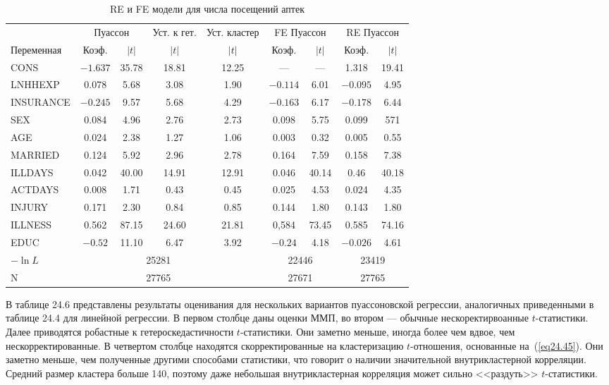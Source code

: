 \begin{table}[h]
\caption{\label{tab:pred} RE и FE модели для числа посещений аптек}
\begin{center}
\begin{tabular}{ p{2.5cm} cc cc cc cc}
\hline
 & \multicolumn{2}{c}{Пуассон} & Уст. к гет. & Уст. кластер & \multicolumn{2}{c}{FE Пуассон} & \multicolumn{2}{c}{RE Пуассон}\\
\cmidrule(r){2-3} \cmidrule(r){4-4} \cmidrule(r){5-5} \cmidrule(r){6-7} \cmidrule(r){8-9}
Переменная & Коэф. & $|t|$ & $|t|$ & $|t|$ & Коэф. & $|t|$ & Коэф. & $|t|$ \\
\hline
CONS & $-1.637$ & 35.78 & 18.81 & 12.25 & ---  & --- & 1.318 & 19.41 \\
LNHHEXP & 0.078 & 5.68 & 3.08 & 1.90 & $-0.114$ & 6.01 & $-0.095$ & 4.95 \\
INSURANCE & $-0.245$ & 9.57 & 5.68 & 4.29 & $-0.163$ & $6.17$ & $-0.178$ & $6.44$ \\
SEX & 0.084 & 4.96 & 2.76 & 2.73 & 0.098 & 5.75 & 0.099 & 571 \\
AGE & 0.024 & 2.38 & 1.27 & 1.06 & 0.003 & 0.32 & 0.005 & 0.55 \\
MARRIED & 0.124 & 5.92 & 2.96 & 2.78 & 0.164 & 7.59 & 0.158 & 7.38 \\
ILLDAYS & 0.042 & 40.00 & 14.91 & 12.91 & 0.046 & 40.14 & 0.46 & 40.18 \\
ACTDAYS & 0.008 & 1.71 & 0.43 & 0.45 & 0.025 & 4.53 & 0.024 & 4.35 \\
INJURY & 0.171 & 2.30 & 0.84 & 0.85 & 0.144 & 1.80 & 0.143 & 1.80 \\
ILLNESS & 0.562 & 87.15 & 24.60 & 21.81 & 0,584 & 73.45 & 0.585 & 74.16 \\
EDUC & $-0.52$ & 11.10 & 6.47 & 3.92 & $-0.24$ & 4.18 & $-0.026$ & 4.61\\
$-\ln L$ & & \multicolumn{2}{c}{25281} &  & \multicolumn{2}{c}{22446} & \multicolumn{2}{c}{23419} \\
N & & \multicolumn{2}{c}{27765} & & \multicolumn{2}{c}{27671} & \multicolumn{2}{c}{27765} \\
\hline
\hline
\end{tabular}
\end{center}
\end{table}


В таблице 24.6 представлены результаты оценивания для нескольких вариантов пуассоновской регрессии, аналогичных приведенными в таблице 24.4 для линейной регрессии. В первом столбце даны оценки ММП, во втором --- обычные нескоректирвоанные $t$-статистики. Далее приводятся робастные к гетероскедастичности $t$-статистики. Они заметно меньше, иногда более чем вдвое, чем нескорректированные. В четвертом столбце находятся скорректированные на кластеризацию $t$-отношения, основанные на~(\ref{eq24.45}). Они заметно меньше, чем полученные другими способами статистики, что говорит о наличии значительной внутрикластерной корреляции. Средний размер кластера больше 140, поэтому даже небольшая внутрикластерная корреляция может сильно <<раздуть>> $t$-статистики. 

